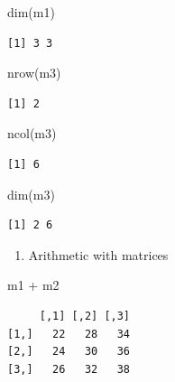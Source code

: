 \documentclass[
  letterpaper,
  DIV=11,
  numbers=noendperiod]{scrreprt}
\newenvironment{Shaded}{\begin{snugshade}}{\end{snugshade}}
\newcommand{\FunctionTok}[1]{\textcolor[rgb]{0.28,0.35,0.67}{#1}}
\newcommand{\NormalTok}[1]{\textcolor[rgb]{0.00,0.23,0.31}{#1}}
\newcommand{\SpecialCharTok}[1]{\textcolor[rgb]{0.37,0.37,0.37}{#1}}
\providecommand{\tightlist}{%
  \setlength{\itemsep}{0pt}\setlength{\parskip}{0pt}}\usepackage{longtable,booktabs,array}
\begin{document}
\begin{Shaded}
\begin{Highlighting}[]
\FunctionTok{dim}\NormalTok{(m1)}
\end{Highlighting}
\end{Shaded}

\begin{verbatim}
[1] 3 3
\end{verbatim}

\begin{Shaded}
\begin{Highlighting}[]
\FunctionTok{nrow}\NormalTok{(m3)}
\end{Highlighting}
\end{Shaded}

\begin{verbatim}
[1] 2
\end{verbatim}

\begin{Shaded}
\begin{Highlighting}[]
\FunctionTok{ncol}\NormalTok{(m3)}
\end{Highlighting}
\end{Shaded}

\begin{verbatim}
[1] 6
\end{verbatim}

\begin{Shaded}
\begin{Highlighting}[]
\FunctionTok{dim}\NormalTok{(m3)}
\end{Highlighting}
\end{Shaded}

\begin{verbatim}
[1] 2 6
\end{verbatim}

\begin{enumerate}
\def\labelenumi{\alph{enumi}.}
\setcounter{enumi}{2}
\tightlist
\item
  Arithmetic with matrices
\end{enumerate}

\begin{Shaded}
\begin{Highlighting}[]
\NormalTok{m1 }\SpecialCharTok{+}\NormalTok{ m2}
\end{Highlighting}
\end{Shaded}

\begin{verbatim}
     [,1] [,2] [,3]
[1,]   22   28   34
[2,]   24   30   36
[3,]   26   32   38
\end{verbatim}
\end{document}
